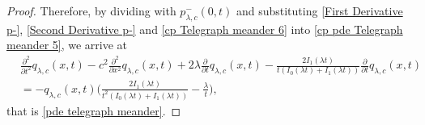 \documentclass[10pt,a4paper]{amsart}
\begin{document}
\begin{proof}
Therefore, by dividing with $p^{-}_{\lambda,c}(0,t)$ and substituting \eqref{First Derivative p-}, \eqref{Second Derivative p-} and \eqref{cp Telegraph meander 6} into \eqref{cp pde Telegraph meander 5}, we arrive at
\begin{align*}\label{pde Telegraph meander 2}
&\frac{\partial^2}{\partial t^2}q_{\lambda,c}(x,t) - c^2\frac{\partial^2}{\partial x^2}q_{\lambda,c}(x,t) +2\lambda\frac{\partial}{\partial t}q_{\lambda,c}(x,t)-\frac{2I_1(\lambda t)}{t(I_0(\lambda t)+I_1(\lambda t))} \frac{\partial}{\partial t}q_{\lambda,c}(x,t) \nonumber\\
&=-q_{\lambda,c}(x,t)\Big(\frac{2I_1(\lambda t)}{t^2(I_0(\lambda t)+I_1(\lambda t))}-\frac{\lambda}{t}\Big),
\end{align*}
that is \eqref{pde telegraph meander}.
\end{proof}
\end{document}
